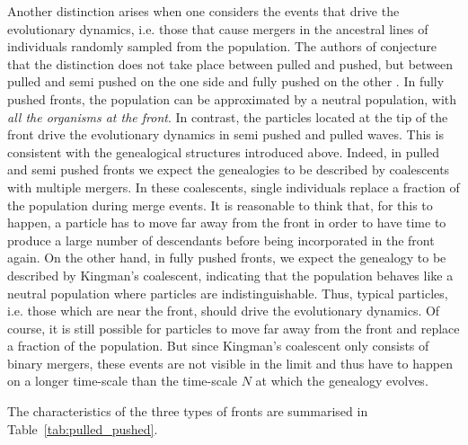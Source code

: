 \documentclass[11pt]{article}
\theoremstyle{plain}
\begin{document}
Another distinction arises when one considers the events that drive the evolutionary dynamics, i.e. those that cause mergers in the ancestral lines of individuals randomly sampled from the population. The authors of \cite{Birzu2018} conjecture that the distinction does not take place between pulled and pushed, but between pulled and semi pushed on the one side and fully pushed on the other \cite[SI, p36]{Birzu2018}. In fully pushed fronts, the population can be approximated by a neutral population, with \textit{all the organisms at the front}. In contrast, the particles located at the tip of the front  drive the evolutionary dynamics in semi pushed and pulled waves.
This is consistent with the genealogical structures introduced above. Indeed, in pulled and semi pushed fronts we expect the genealogies to be described by coalescents with multiple mergers. In these coalescents, single individuals replace a fraction of the population during merge events. It is reasonable to think that, for this to happen, a particle has to move far away from the front in order to have time to produce a large number of descendants before being incorporated in the front again. On the other hand, in fully pushed fronts, we expect the genealogy to be described by Kingman's coalescent, indicating that the population behaves like a neutral population where particles are indistinguishable. Thus, typical particles, i.e. those which are near the front, should drive the evolutionary dynamics. Of course, it is still possible for particles to move far away from the front and replace a fraction of the population. But since Kingman's coalescent only consists of binary mergers, these events are not visible in the limit and thus have to happen on a longer time-scale than the time-scale $N$ at which the genealogy evolves.

The characteristics of the three types of fronts are summarised in Table~\ref{tab:pulled_pushed}.
\end{document}
